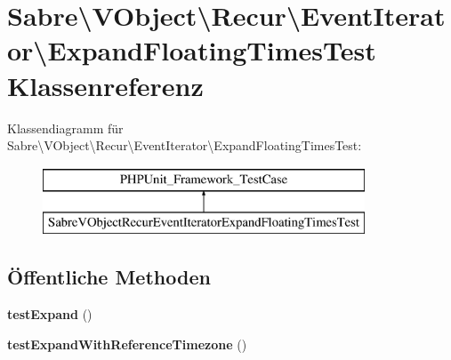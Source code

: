 \hypertarget{class_sabre_1_1_v_object_1_1_recur_1_1_event_iterator_1_1_expand_floating_times_test}{}\section{Sabre\textbackslash{}V\+Object\textbackslash{}Recur\textbackslash{}Event\+Iterator\textbackslash{}Expand\+Floating\+Times\+Test Klassenreferenz}
\label{class_sabre_1_1_v_object_1_1_recur_1_1_event_iterator_1_1_expand_floating_times_test}
Klassendiagramm für Sabre\textbackslash{}V\+Object\textbackslash{}Recur\textbackslash{}Event\+Iterator\textbackslash{}Expand\+Floating\+Times\+Test\+:\begin{figure}[H]
\begin{center}
\leavevmode
\includegraphics[height=2.000000cm]{class_sabre_1_1_v_object_1_1_recur_1_1_event_iterator_1_1_expand_floating_times_test}
\end{center}
\end{figure}
\subsection*{Öffentliche Methoden}
\begin{DoxyCompactItemize}
\item 
\mbox{\label{class_sabre_1_1_v_object_1_1_recur_1_1_event_iterator_1_1_expand_floating_times_test_ad91bd5f6be25309c82be688bf76772f7}} 
{\bfseries test\+Expand} ()
\item 
\mbox{\label{class_sabre_1_1_v_object_1_1_recur_1_1_event_iterator_1_1_expand_floating_times_test_a187b60c2cc6cd8653f812d552ea455ea}} 
{\bfseries test\+Expand\+With\+Reference\+Timezone} ()
\end{DoxyCompactItemize}


